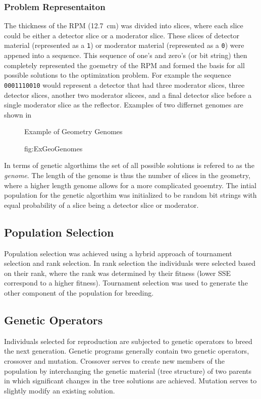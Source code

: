 \subsubsection{Problem Representaiton}
The thickness of the RPM  (\SI{12.7}{\cm}) was divided into slices, where each slice could be either a detector slice or a moderator slice.
These slices of detector material (represented as a \verb+1+) or moderator material (represented as a \verb+0+) were appened into a sequence.
This sequence of one's and zero's (or bit string) then completely represented the goemetry of the RPM and formed the basis for all possible solutions to the optimization problem.
For example the sequence \verb+0001110010+ would represent a detector that had three moderator slices, three detector slices, another two moderator slicees, and a final detector slice before a single moderator slice as the reflector.
Examples of two differnet genomes are shown in 
\begin{figure}

  \caption[Example Geometries Genomes]{Example of Geometry Genomes}
  \caption{fig:ExGeoGenomes}
\end{figure}
In terms of genetic algorthims the set of all possible solutions is refered to as the \textit{genome}.
The length of the genome is thus the number of slices in the geometry, where a higher length genome allows for a more complicated geoemtry.
The intial population for the genetic algorthim was initialized to be random bit strings with equal probability of a slice being a detector slice or moderator.

\subsection{Population Selection}

Population selection was achieved using a hybrid approach of tournament
selection and rank selection. In rank selection the individuals were
selected based on their rank, where the rank was determined by their
fitness (lower SSE correspond to a higher fitness). Tournament selection
was used to generate the other component of the population for breeding.
\subsection{Genetic Operators}

Individuals selected for reproduction are subjected to genetic operators
to breed the next generation. Genetic programs generally contain two
genetic operators, crossover and mutation. Crossover serves to create
new members of the population by interchanging the genetic material
(tree structure) of two parents in which significant changes in the
tree solutions are achieved. Mutation serves to slightly modify an
existing solution. 


